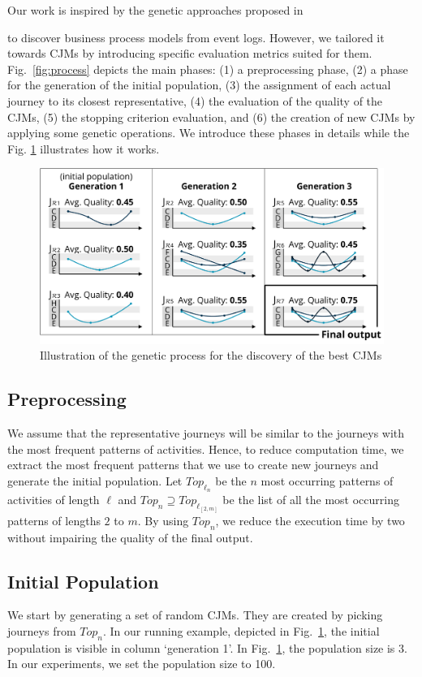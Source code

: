 \documentclass[runningheads]{llncs}
\begin{document}
{Our work is inspired by the genetic approaches proposed in \cite{buijs2012genetic,vazquez2015prodigen,de2005genetic} {to discover business process models from event logs. However, we tailored it towards CJMs by introducing specific evaluation metrics suited for them. Fig.~\ref{fig:process} depicts the main phases: (1) a preprocessing phase, (2) a phase for the generation of the initial population, (3) the assignment of each actual journey to its closest representative, (4) the evaluation of the quality of the CJMs, (5) the stopping criterion evaluation, and (6) the creation of new CJMs by applying some genetic operations. We introduce these phases in details while the Fig. \ref{fig:intuition2} illustrates how it works. 

\begin{figure}
\centering
\includegraphics[width=1\columnwidth]{05_schema/intuition2.pdf}
  \caption{Illustration of the genetic process for the discovery of the best CJMs}
  \label{fig:intuition2}
\end{figure}

\subsection{Preprocessing} \label{preprocessing}
We assume that the representative journeys will be similar to the journeys with the most frequent patterns of activities. Hence, to reduce computation time, we extract the most frequent patterns that we use to create new journeys and generate the initial population. Let $Top_{\ell_n}$ be the $n$ most occurring patterns of activities of length $\ell$ and $Top_n \supseteq Top_{\ell_{[2,m]}}$ be the list of all the most occurring patterns of lengths $2$ to $m$. By using $Top_n$, we reduce the execution time by two without impairing the quality of the final output.

\subsection{Initial Population}
\label{chap:initial-population}
We start by generating a set of random CJMs. They are created by picking journeys from $Top_n$. In our running example, depicted in Fig.~\ref{fig:intuition2}, the initial population is visible in column `generation 1'. In Fig.~\ref{fig:intuition2}, the population size is 3. In our experiments, we set the population size to 100. 

}}
\end{document}

